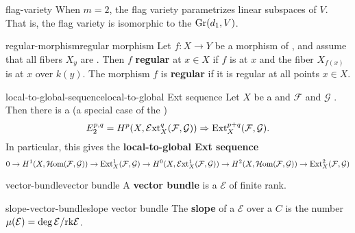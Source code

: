 \begin{example}{flag-variety}
    When $m = 2$, the flag variety parametrizes linear subspaces of $V$. That is, the flag variety is isomorphic to the  $\textup{Gr}(d_1, V)$.
\end{example}

\begin{topic}{regular-morphism}{regular morphism}
    Let $f : X \to Y$ be a morphism of , and assume that all fibers $X_y$ are . Then $f$ \textbf{regular} at $x \in X$ if $f$ is  at $x$ and the fiber $X_{f(x)}$ is  at $x$ over $k(y)$. The morphism $f$ is \textbf{regular} if it is regular at all points $x \in X$.
\end{topic}

\begin{topic}{local-to-global-sequence}{local-to-global Ext sequence}
    Let $X$ be a  and $\mathcal{F}$ and $\mathcal{G}$ . Then there is a  (a special case of the )
    \[ E_2^{p, q} = H^p(X, \mathcal{E}\textup{xt}_X^q(\mathcal{F}, \mathcal{G})) \Rightarrow \textup{Ext}_X^{p + q}(\mathcal{F}, \mathcal{G}) . \]
    In particular, this gives the \textbf{local-to-global Ext sequence}
    \[ 0 \to H^1(X, \mathcal{H}\textup{om}(\mathcal{F}, \mathcal{G})) \to \textup{Ext}_X^1(\mathcal{F}, \mathcal{G}) \to H^0(X, \mathcal{E}\textup{xt}_X^1(\mathcal{F}, \mathcal{G})) \to H^2(X, \mathcal{H}\textup{om}(\mathcal{F}, \mathcal{G})) \to \textup{Ext}_X^2(\mathcal{F}, \mathcal{G}) \]
\end{topic}

\begin{topic}{vector-bundle}{vector bundle}
    A \textbf{vector bundle} is a  $\mathcal{E}$ of finite rank.
\end{topic}

\begin{topic}{slope-vector-bundle}{slope vector bundle}
    The \textbf{slope} of a  $\mathcal{E}$ over a  $C$ is the number $\mu(\mathcal{E}) = \deg \mathcal{E} / \textup{rk} \mathcal{E}$.
\end{topic}


